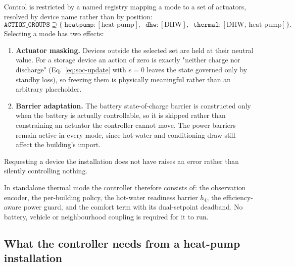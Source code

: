 \documentclass[11pt]{article}
\begin{document}
Control is restricted by a named registry mapping a mode to a set of actuators,
resolved by device name rather than by position:
$$
\texttt{ACTION\_GROUPS} \supseteq \Big\{\;\texttt{heatpump}\!:\![\text{heat pump}],\;\;
\texttt{dhw}\!:\![\text{DHW}],\;\; \texttt{thermal}\!:\![\text{DHW},\ \text{heat pump}] \Big\}.
$$
Selecting a mode has two effects:
\begin{enumerate}[nosep]
\item \textbf{Actuator masking.} Devices outside the selected set are held at
their neutral value. For a storage device an action of zero is exactly "neither
charge nor discharge" (Eq.~\ref{eq:soc-update} with $e = 0$ leaves the state
governed only by standby loss), so freezing them is physically meaningful rather
than an arbitrary placeholder.
\item \textbf{Barrier adaptation.} The battery state-of-charge barrier is
constructed only when the battery is actually controllable, so it is skipped
rather than constraining an actuator the controller cannot move. The power
barriers remain active in every mode, since hot-water and conditioning draw still
affect the building's import.
\end{enumerate}
Requesting a device the installation does not have raises an error rather than
silently controlling nothing.

In standalone thermal mode the controller therefore consists of: the
observation encoder, the per-building policy, the hot-water readiness barrier
$h_4$, the efficiency-aware power guard, and the comfort term with its
dual-setpoint deadband. No battery, vehicle or neighbourhood coupling is
required for it to run.

\subsection{What the controller needs from a heat-pump installation}
\end{document}
